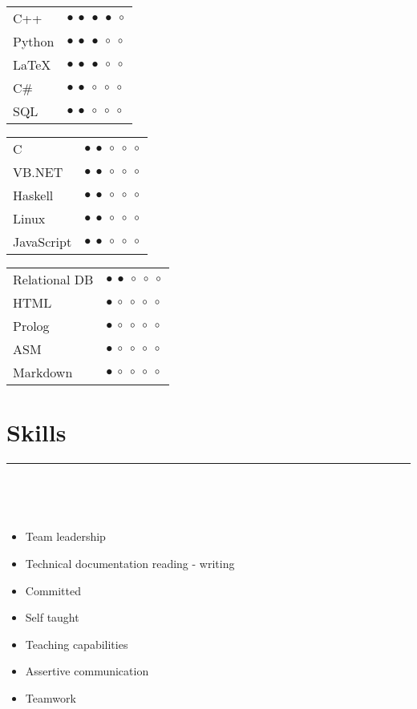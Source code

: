 \documentclass{article}
\begin{document}
\begin{multicols}{3}
    \begin{tabular}{l l}
        C++ & $\bullet~\bullet~\bullet~\bullet~\circ$ \\
        Python & $\bullet~\bullet~\bullet~\circ~\circ$ \\
        LaTeX & $\bullet~\bullet~\bullet~\circ~\circ$ \\
        C\# & $\bullet~\bullet~\circ~\circ~\circ$ \\
        SQL & $\bullet~\bullet~\circ~\circ~\circ$
    \end{tabular}
    
    \begin{tabular}{l l}
        C & $\bullet~\bullet~\circ~\circ~\circ$ \\
        VB.NET & $\bullet~\bullet~\circ~\circ~\circ$ \\
        Haskell & $\bullet~\bullet~\circ~\circ~\circ$ \\
        Linux & $\bullet~\bullet~\circ~\circ~\circ$ \\
        JavaScript & $\bullet~\bullet~\circ~\circ~\circ$
    \end{tabular}
    
    \begin{tabular}{l l}
        Relational DB & $\bullet~\bullet~\circ~\circ~\circ$ \\
        HTML & $\bullet~\circ~\circ~\circ~\circ$ \\
        Prolog & $\bullet~\circ~\circ~\circ~\circ$ \\
        ASM & $\bullet~\circ~\circ~\circ~\circ$ \\
        Markdown & $\bullet~\circ~\circ~\circ~\circ$
    \end{tabular} 
\end{multicols}


\section*{Skills} 
\hrule
\

\

\begin{multicols}{2}
    \begin{itemize}
        \item Team leadership
        \item Technical documentation reading - writing
        \item Committed
        \item Self taught
        \item Teaching capabilities
        \item Assertive communication
        \item Teamwork 
    \end{itemize}
\end{multicols}
\end{document}
